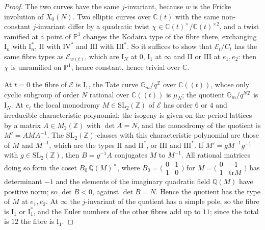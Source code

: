\documentclass[11pt,reqno]{amsart}
\numberwithin{equation}{section}
\theoremstyle{plain}
\theoremstyle{definition}
\newcommand{\QQ}{\mathbb{Q}}
\newcommand{\ZZ}{\mathbb{Z}}
\newcommand{\CC}{\mathbb{C}}
\newcommand{\PP}{\mathbb{P}}
\newcommand{\SL}{\mathrm{SL}}
\begin{document}
\begin{proof}
The two curves have the same $j$-invariant, because $w$ is the Fricke involution of $X_{0}(N)$. Two elliptic curves over $\CC(t)$ with the same non-constant $j$-invariant differ by a quadratic twist $\chi\in\CC(t)^{\times}/\CC(t)^{\times2}$, and a twist ramified at a point of $\PP^{1}$ changes the Kodaira type of the fibre there, exchanging $\mathrm{I}_{n}$ with $\mathrm{I}_{n}^{*}$, $\mathrm{II}$ with $\mathrm{IV}^{*}$ and $\mathrm{III}$ with $\mathrm{III}^{*}$. So it suffices to show that $\mathcal{E}_{t}/C_{t}$ has the same fibre types as $\mathcal{E}_{w(t)}$, which are $\mathrm{I}_{N}$ at $0$, $\mathrm{I}_{1}$ at $\infty$ and $\mathrm{II}$ or $\mathrm{III}$ at $e_{1},e_{2}$: then $\chi$ is unramified on $\PP^{1}$, hence constant, hence trivial over $\CC$.

At $t=0$ the fibre of $\mathcal{E}$ is $\mathrm{I}_{1}$, the Tate curve $\mathbb{G}_{m}/q^{\ZZ}$ over $\CC((t))$, whose only cyclic subgroup of order $N$ rational over $\CC((t))$ is $\mu_{N}$; the quotient $\mathbb{G}_{m}/q^{N\ZZ}$ is $\mathrm{I}_{N}$. At $e_{i}$ the local monodromy $M\in\SL_{2}(\ZZ)$ of $\mathcal{E}$ has order $6$ or $4$ and irreducible characteristic polynomial; the isogeny is given on the period lattices by a matrix $A\in M_{2}(\ZZ)$ with $\det A=N$, and the monodromy of the quotient is $M'=AMA^{-1}$. The $\SL_{2}(\ZZ)$-classes with this characteristic polynomial are those of $M$ and $M^{-1}$, which are the types $\mathrm{II}$ and $\mathrm{II}^{*}$, or $\mathrm{III}$ and $\mathrm{III}^{*}$. If $M'=gM^{-1}g^{-1}$ with $g\in\SL_{2}(\ZZ)$, then $B=g^{-1}A$ conjugates $M$ to $M^{-1}$. All rational matrices doing so form the coset $B_{0}\,\QQ(M)^{\times}$, where $B_{0}=\bigl(\begin{smallmatrix}0&1\\1&0\end{smallmatrix}\bigr)$ for $M=\bigl(\begin{smallmatrix}0&-1\\1&\mathrm{tr}M\end{smallmatrix}\bigr)$ has determinant $-1$ and the elements of the imaginary quadratic field $\QQ(M)$ have positive norm; so $\det B<0$, against $\det B=N$. Hence the quotient has the type of $M$ at $e_{1},e_{2}$. At $\infty$ the $j$-invariant of the quotient has a simple pole, so the fibre is $\mathrm{I}_{1}$ or $\mathrm{I}_{1}^{*}$, and the Euler numbers of the other fibres add up to $11$; since the total is $12$ the fibre is $\mathrm{I}_{1}$.
\end{proof}
\end{document}
